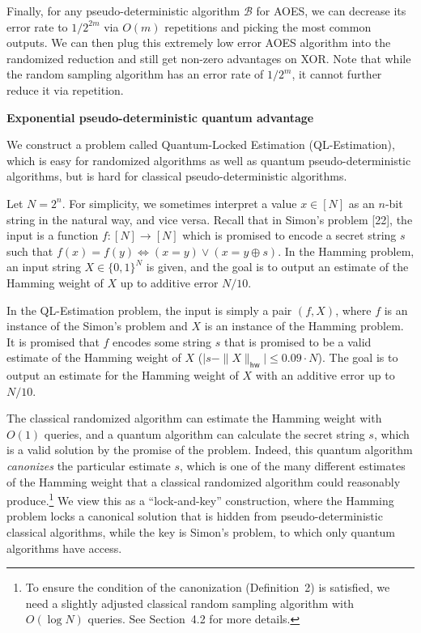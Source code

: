 \documentclass[10pt,a4paper]{article}
\begin{document}
Finally, for any pseudo-deterministic algorithm $\mathcal{B}$ for AOES, we can decrease its error rate to $1/2^{2m}$ via $O(m)$ repetitions and picking the most common outputs. We can then plug this extremely low error AOES algorithm into the randomized reduction and still get non-zero advantages on XOR. Note that while the random sampling algorithm has an error rate of $1/2^{m}$, it cannot further reduce it via repetition.\par





\par\medskip\noindent\textbf{Exponential pseudo-deterministic quantum advantage}\par




We construct a problem called Quantum-Locked Estimation (QL-Estimation), which is easy for randomized algorithms as well as quantum pseudo-deterministic algorithms, but is hard for classical pseudo-deterministic algorithms.\par




Let $N=2^{n}$. For simplicity, we sometimes interpret a value $x\in[N]$ as an $n$-bit string in the natural way, and vice versa.
Recall that in Simon’s problem [22],
the input is a function $f:[N]\rightarrow[N]$ which is promised to encode a secret string $s$ such that $f(x)=f(y)\iff(x=y)\vee(x=y\oplus s)$. In the Hamming problem, an input string $X\in\{0,1\}^{N}$ is given, and the goal is to output an estimate of the Hamming weight of $X$ up to additive error $N/10$.\par




In the QL-Estimation problem, the input is simply a pair $(f,X)$, where $f$ is an instance of the Simon’s problem and $X$ is an instance of the Hamming problem.
It is promised that $f$ encodes some string $s$ that is promised to be a valid estimate of the Hamming weight of $X$ ($\big|s-\|X\|_{\mathsf{hw}}\big|\leq 0.09\cdot N$).
The goal is to output an estimate for the Hamming weight of $X$ with an additive error up to $N/10$.\par




The classical randomized algorithm can estimate the Hamming weight with $O(1)$ queries, and a quantum algorithm can calculate the secret string $s$, which is a valid solution by the promise of the problem. Indeed, this quantum algorithm \emph{canonizes} the particular estimate $s$, which is one of the many different estimates of the Hamming weight that a classical randomized algorithm could reasonably produce.\footnote{To ensure the condition of the canonization (Definition 2) is satisfied, we need a slightly adjusted classical random sampling algorithm with $O(\log N)$ queries. See Section 4.2 for more details.}
We view this as a “lock-and-key” construction, where
the Hamming problem locks a canonical solution that is hidden from pseudo-deterministic classical algorithms, while the key is Simon’s problem, to which only quantum algorithms have access.\par
\end{document}
